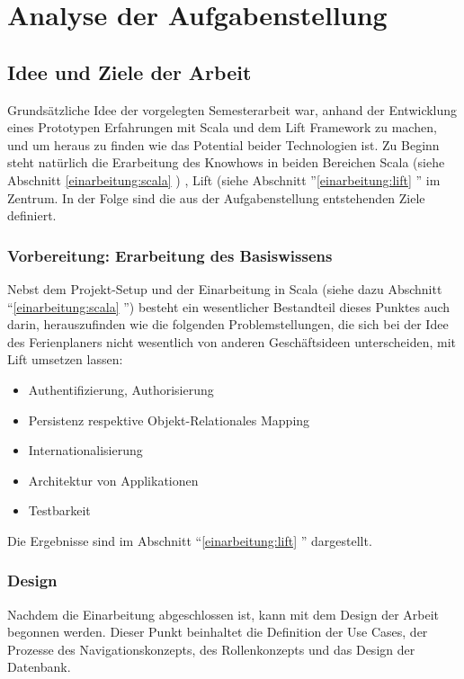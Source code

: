 \chapter{Analyse der Aufgabenstellung}\label{analyse-aufgabenstellung}
\section{Idee und Ziele der Arbeit}
Grunds\"atzliche Idee der vorgelegten Semesterarbeit war, anhand der Entwicklung eines Prototypen Erfahrungen mit Scala und dem Lift Framework zu machen, und um heraus zu finden wie das Potential beider Technologien ist. Zu Beginn steht nat\"urlich die Erarbeitung des Knowhows in beiden Bereichen Scala (siehe Abschnitt \ref{einarbeitung:scala} ) , Lift (siehe Abschnitt ''\ref{einarbeitung:lift} '' im Zentrum. In der Folge sind die aus der Aufgabenstellung entstehenden Ziele definiert.

\subsection{Vorbereitung: Erarbeitung des Basiswissens}
Nebst dem Projekt-Setup und der Einarbeitung in Scala (siehe dazu Abschnitt ``\ref{einarbeitung:scala} '')  besteht ein wesentlicher Bestandteil dieses Punktes auch darin, herauszufinden wie die folgenden Problemstellungen, die sich bei der Idee des Ferienplaners nicht wesentlich von anderen Gesch\"aftsideen unterscheiden, mit Lift umsetzen lassen:
	\begin{itemize}
		\item Authentifizierung, Authorisierung
		\item Persistenz respektive Objekt-Relationales Mapping
		\item Internationalisierung
		\item Architektur von Applikationen
		\item Testbarkeit
	\end{itemize}
Die Ergebnisse sind im Abschnitt  ``\ref{einarbeitung:lift} '' dargestellt.

\subsection{Design}
Nachdem die Einarbeitung abgeschlossen ist, kann mit dem Design der Arbeit begonnen werden. Dieser Punkt beinhaltet die Definition der Use Cases, der Prozesse des Navigationskonzepts, des Rollenkonzepts und das Design der Datenbank.

